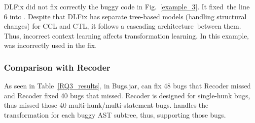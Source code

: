 DLFix did not fix correctly the buggy code in
Fig.~\ref{example_3}. It fixed~the line 6 into    \code{\%}
. Despite that DLFix has separate tree-based models
(handling structural changes) for CCL and CTL,
it follows a cascading architecture~between them.
Thus, incorrect context learning affects transformation
learning. In this example,  was incorrectly used in the
fix.














\subsubsection{\bf Comparison with Recoder}

As seen in Table~\ref{RQ3_results}, in Bugs.jar, {\tool} can fix 48
bugs that Recoder missed and Recoder fixed 40 bugs that {\tool}
missed. Recoder is designed for single-hunk bugs, thus missed
those 40 multi-hunk/multi-statement bugs. {\tool} handles
the transformation for each buggy AST subtree, thus, supporting
those bugs.
